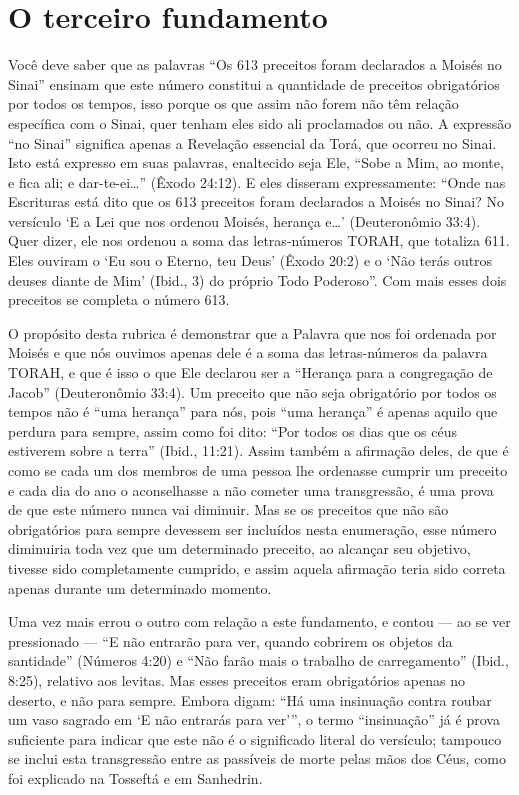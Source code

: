 \chapter*{O terceiro fundamento}

Você deve saber que as palavras ``Os 613 preceitos foram declarados a
Moisés no Sinai'' ensinam que este número constitui a quantidade de
preceitos obrigatórios por todos os tempos, isso porque os que assim não
forem não têm relação específica com o Sinai, quer tenham eles sido ali
proclamados ou não. A expressão ``no Sinai'' significa apenas a
Revelação essencial da Torá, que ocorreu no Sinai. Isto está expresso
em suas palavras, enaltecido seja Ele, ``Sobe a Mim, ao monte, e fica
ali; e dar-te-ei\ldots{}'' (Êxodo 24:12). E eles disseram expressamente:
``Onde nas Escrituras está dito que os 613 preceitos foram declarados a
Moisés no Sinai? No versículo `E a Lei que nos ordenou Moisés, herança
e\ldots{}' (Deuteronômio 33:4). Quer dizer, ele nos ordenou a soma das
letras-números TORAH, que totaliza 611. Eles ouviram o `Eu sou o
Eterno, teu Deus' (Êxodo 20:2) e o `Não terás outros deuses diante de
Mim' (Ibid., 3) do próprio Todo Poderoso''. Com mais esses dois
preceitos se completa o número 613.

O propósito desta rubrica é demonstrar que a Palavra que nos foi
ordenada por Moisés e que nós ouvimos apenas dele é a soma das
letras-números da palavra TORAH, e que é isso o que Ele declarou ser a
``Herança para a congregação de Jacob'' (Deuteronômio 33:4). Um preceito
que não seja obrigatório por todos os tempos não é ``uma herança'' para
nós, pois ``uma herança'' é apenas aquilo que perdura para sempre,
assim como foi dito: ``Por todos os dias que os céus estiverem sobre a
terra'' (Ibid., 11:21). Assim também a afirmação deles, de que é como
se cada um dos membros de uma pessoa lhe ordenasse cumprir um preceito
e cada dia do ano o aconselhasse a não cometer uma transgressão, é uma
prova de que este número nunca vai diminuir. Mas se os preceitos que não
são obrigatórios para sempre devessem ser incluídos nesta enumeração,
esse número diminuiria toda vez que um determinado preceito, ao alcançar
seu objetivo, tivesse sido completamente cumprido, e assim aquela
afirmação teria sido correta apenas durante um determinado momento.

Uma vez mais errou o outro com relação a este fundamento, e contou ---
ao se ver pressionado --- ``E não entrarão para ver, quando cobrirem os
objetos da santidade'' (Números 4:20) e ``Não farão mais o trabalho de
carregamento'' (Ibid., 8:25), relativo aos levitas. Mas esses preceitos
eram obrigatórios apenas no deserto, e não para sempre. Embora digam:
``Há uma insinuação contra roubar um vaso sagrado em `E não entrarás
para ver''', o termo ``insinuação'' já é prova suficiente para indicar
que este não é o significado literal do versículo; tampouco se inclui
esta transgressão entre as passíveis de morte pelas mãos dos Céus, como
foi explicado na Tosseftá e em Sanhedrin.

